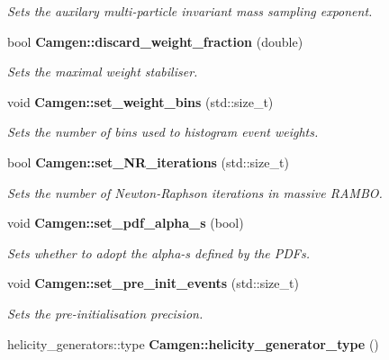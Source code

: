 \begin{DoxyCompactItemize}
\begin{DoxyCompactList}\small\item\em Sets the auxilary multi-\/particle invariant mass sampling exponent. \end{DoxyCompactList}\item 
bool {\bfseries Camgen\+::discard\+\_\+weight\+\_\+fraction} (double)
\begin{DoxyCompactList}\small\item\em Sets the maximal weight stabiliser. \end{DoxyCompactList}\item 
\hypertarget{a00878_aa89925c5963205476e5eab0603de642a}{}void {\bfseries Camgen\+::set\+\_\+weight\+\_\+bins} (std\+::size\+\_\+t)\label{a00878_aa89925c5963205476e5eab0603de642a}

\begin{DoxyCompactList}\small\item\em Sets the number of bins used to histogram event weights. \end{DoxyCompactList}\item 
bool {\bfseries Camgen\+::set\+\_\+\+N\+R\+\_\+iterations} (std\+::size\+\_\+t)
\begin{DoxyCompactList}\small\item\em Sets the number of Newton-\/\+Raphson iterations in massive R\+A\+M\+B\+O. \end{DoxyCompactList}\item 
\hypertarget{a00878_aefa2cea0a25ca101c7302b4483fb9b24}{}void {\bfseries Camgen\+::set\+\_\+pdf\+\_\+alpha\+\_\+s} (bool)\label{a00878_aefa2cea0a25ca101c7302b4483fb9b24}

\begin{DoxyCompactList}\small\item\em Sets whether to adopt the alpha-\/s defined by the P\+D\+F\textquotesingle{}s. \end{DoxyCompactList}\item 
\hypertarget{a00878_a858c6ffafa0806fb33c28a0d40708866}{}void {\bfseries Camgen\+::set\+\_\+pre\+\_\+init\+\_\+events} (std\+::size\+\_\+t)\label{a00878_a858c6ffafa0806fb33c28a0d40708866}

\begin{DoxyCompactList}\small\item\em Sets the pre-\/initialisation precision. \end{DoxyCompactList}\item 
\hypertarget{a00878_a85645287db586b6dc0c30ae712d8089f}{}helicity\+\_\+generators\+::type {\bfseries Camgen\+::helicity\+\_\+generator\+\_\+type} ()\label{a00878_a85645287db586b6dc0c30ae712d8089f}


\end{DoxyCompactItemize}
